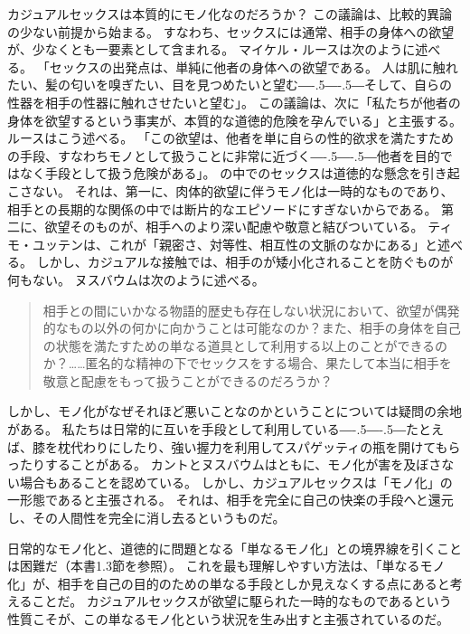 \documentclass[paper=a4,book,openany]{jlreq}
\def\DDASH{―\kern-.5\zw―\kern-.5\zw―}
\begin{document}
カジュアルセックスは本質的にモノ化なのだろうか？ この議論は、比較的異論の少ない前提から始まる。
すなわち、セックスには通常、相手の身体への欲望が、少なくとも一要素として含まれる。
マイケル・ルースは次のように述べる。
「セックスの出発点は、単純に他者の身体への欲望である。
人は肌に触れたい、髪の匂いを嗅ぎたい、目を見つめたいと望む{\DDASH}そして、自らの性器を相手の性器に触れさせたいと望む」。
この議論は、次に「私たちが他者の身体を欲望するという事実が、本質的な道徳的危険を孕んでいる」と主張する。
ルースはこう述べる。
「この欲望は、他者を単に自らの性的欲求を満たすための手段、すなわちモノとして扱うことに非常に近づく{\DDASH}他者を目的ではなく手段として扱う危険がある」\citep[p. 185]{ruse88:_homos}。
の中でのセックスは道徳的な懸念を引き起こさない。
それは、第一に、肉体的欲望に伴うモノ化は一時的なものであり、相手との長期的な関係の中では断片的なエピソードにすぎないからである。
第二に、欲望そのものが、相手へのより深い配慮や敬意と結びついている。
ティモ・ユッテンは、これが「親密さ、対等性、相互性の文脈のなかにある」と述べる\citep[p. 31]{jutten16:_sexual_objec}。
しかし、カジュアルな接触では、相手のが矮小化されることを防ぐものが何もない。
ヌスバウムは次のように述べる。

\begin{quote}
  相手との間にいかなる物語的歴史も存在しない状況において、欲望が偶発的なもの以外の何かに向かうことは可能なのか？また、相手の身体を自己の状態を満たすための単なる道具として利用する以上のことができるのか？……匿名的な精神の下でセックスをする場合、果たして本当に相手を敬意と配慮をもって扱うことができるのだろうか？\citep[p. 287]{nussbaum95:_objec}
\end{quote}

しかし、モノ化がなぜそれほど悪いことなのかということについては疑問の余地がある。
私たちは日常的に互いを手段として利用している{\DDASH}たとえば、膝を枕代わりにしたり、強い握力を利用してスパゲッティの瓶を開けてもらったりすることがある。
カントとヌスバウムはともに、モノ化が害を及ぼさない場合もあることを認めている。
しかし、カジュアルセックスは「モノ化」の一形態であると主張される。
それは、相手を完全に自己の快楽の手段へと還元し、その人間性を完全に消し去るというものだ。

日常的なモノ化と、道徳的に問題となる「単なるモノ化」との境界線を引くことは困難だ（本書1.3節を参照）。
これを最も理解しやすい方法は、「単なるモノ化」が、相手を自己の目的のための単なる手段としか見えなくする点にあると考えることだ。
カジュアルセックスが欲望に駆られた一時的なものであるという性質こそが、この単なるモノ化という状況を生み出すと主張されているのだ。
\end{document}
